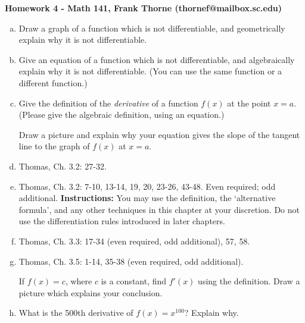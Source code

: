 \documentclass[12pt]{article}
\begin{document}
\setlength{\topmargin}{-2mm}





\begin{center}{\bf Homework 4 - Math 141, Frank Thorne (thornef@mailbox.sc.edu)}
\end{center}
\begin{enumerate}[(a)]

\item
Draw a graph of a function which is not differentiable, and geometrically explain why it is not differentiable.

\item
Give an equation of a function which is not differentiable, and algebraically explain why it is not differentiable.
(You can use the same function or a different function.)

\item
Give the definition of the {\itshape derivative} of a function
$f(x)$ at the point $x = a$. (Please give the algebraic definition,
using an equation.)

Draw a picture and explain why your
equation gives the slope of the tangent line to the graph of $f(x)$
at $x = a$.

\item
Thomas, Ch. 3.2: 27-32.
\item
Thomas, Ch. 3.2: 7-10, 13-14, 19, 20, 23-26, 43-48. Even required; odd additional.
{\bf Instructions:} You may use the definition, the `alternative formula', and
any other techniques in this chapter at your discretion. Do not use the differentiation
rules introduced in later chapters.

\item
Thomas, Ch. 3.3: 17-34 (even required, odd additional), 57, 58.

\item
Thomas, Ch. 3.5: 1-14, 35-38 (even required, odd additional).

If $f(x) = c$, where $c$ is a constant, find $f'(x)$ using the definition.
Draw a picture which explains your conclusion.

\item
What is the 500th derivative of $f(x) = x^{100}$? Explain why.

\end{enumerate}
\end{document}
